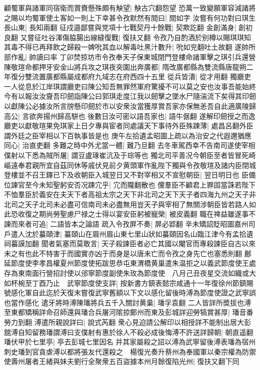 顧蜀軍與諸軍同宿衛而賞賚懸殊頗有觖望|{
	觖古穴翻怨望}
恐萬一致變願軍容減諸將之賜以均蜀軍使土客如一則上下幸甚令孜默然有間曰|{
	間如字}
汝嘗有何功對曰琪生長山東|{
	長知兩翻}
征戍邉鄙嘗與党項十七戰契丹十餘戰|{
	契欺訖翻}
金創滿身|{
	創初良翻}
又嘗征吐谷渾傷脇腸出線縫復戰|{
	復扶又翻}
令孜乃自酌酒於别樽以賜琪琪知其毒不得已再拜飲之歸殺一婢吮其血以解毒吐黑汁數升|{
	吮如兖翻吐土故翻}
遂帥所部作亂|{
	帥讀曰率}
丁卯焚掠坊市令孜奉天子保東城閉門登樓命諸軍擊之琪引兵還營陳敬瑄命都押牙安金山將兵攻之琪夜突圍出奔廣都|{
	隋改廣都縣為雙流縣唐龍朔二年復分雙流置廣都縣屬成都府九域志在府西四十五里}
從兵皆潰|{
	從才用翻}
獨廳吏一人從息於江岸琪謂廳吏曰陳公知吾無罪然軍府驚擾不可以莫之安也汝事吾能始終今有以報汝汝齎吾印劒詣陳公曰郭琪走度江我以劒擊之墜水尸隨湍流下矣得其印劒以獻陳公必據汝所言牓懸印劒於市以安衆汝當獲厚賞吾家亦保無恙吾自此適廣陵歸高公|{
	言欲奔揚州歸高駢也}
後數日汝可密以語吾家也|{
	語牛倨翻}
遂解印劒授之而逸廳吏以獻敬瑄果免琪家上日夕專與宦者同處議天下事待外臣殊踈薄|{
	處昌呂翻外臣謂外廷之臣宰相以下百執事皆是也}
庚午左拾遺孟昭圖上疏以為治安之代遐邇猶應同心|{
	治直吏翻}
多難之時中外尤當一體|{
	難乃旦翻}
去冬車駕西幸不告南司遂使宰相僕射以下悉為賊所屠|{
	謂豆盧瑑崔沆及于琮等也}
獨北司平善况今朝臣至者皆冒死崎嶇遠奉君親所宜自茲同休等戚伏見前夕黄頭軍作亂陛下獨與令孜敬瑄及諸内臣閉城登樓並不召王鐸已下及收朝臣入城翌日又不對宰相又不宣慰朝臣|{
	翌日明日也}
臣備位諫官至今未知聖躬安否况踈宂乎|{
	宂而隴翻散也}
儻羣臣不顧君上罪固當誅若陛下不恤羣臣於義安在夫天下者高祖太宗之天下非北司之天下天子者四海九州之天子非北司之天子北司未必盡可信南司未必盡無用豈天子與宰相了無關涉朝臣皆若路人如此恐收復之期尚勞聖慮尸禄之士得以宴安臣躬被寵榮|{
	被皮義翻}
職在禆益雖遂事不諫而來者可追|{
	二語皆本之論語}
疏入令孜屏不奏|{
	屏必郢翻}
辛未矯詔貶昭圖嘉州司戶遣人沈於蟇頤津|{
	蟇頤山在眉州眉山東七里山狀如蟇頤因名山臨江津今有孟拾遺祠蟇謨加翻}
聞者氣塞而莫敢言|{
	天子殺諫臣者必亡其國以閹官而專殺諫臣自古以來未之有也此不特害于而國實亦凶于而身是以唐未亡而令孜之身先亡也塞悉則翻}
鄜延節度使李孝昌權夏州節度使拓跋思恭屯東渭橋黄巢遣朱温拒之以義武節度使王處存為東南面行營招討使以邠寧節度副使朱玫為節度使　八月己丑夜星交流如織或大如杯椀至丁酉乃止　武寧節度使支詳|{
	按新書方鎮表懿宗咸通十一年復徐州節鎮賜號感化軍自此迄於天復末嘗復武寧舊額以下文以感化留後時溥為節度使證之武寧誤也當作感化}
遣牙將時溥陳璠將兵五千入關討黄巢|{
	璠孚袁翻}
二人皆詳所奬拔也溥至東都矯稱詳命召師還與璠合兵屠河隂掠鄭州而東及彭城詳迎勞犒賞甚厚|{
	璠音番勞力到翻}
溥遣所親說詳曰|{
	說式芮翻}
衆心見迫請公解印以相授詳不能制出居大彭舘溥自知留務璠謂溥曰支僕射有惠於徐人不殺必成後悔溥不許送詳歸朝|{
	朝直遥翻}
璠伏甲於七里亭|{
	亭去彭城七里因名}
并其家屬殺之詔以溥為武寧留後溥表璠為宿州刺史璠到官貪虐溥以都將張友代還殺之　楊復光奏升蔡州為奉國軍以秦宗權為防禦使壽州屠者王緒與妹夫劉行全聚衆五百盜據本州月餘復陷光州|{
	復扶又翻下同}
